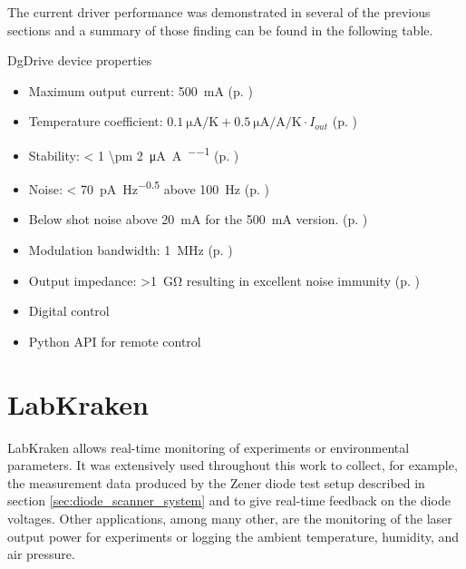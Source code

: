 The current driver performance was demonstrated in several of the previous sections and a summary of those finding can be found in the following table.
\begin{center}
    \begin{deviceProperties}[label={lst:dgDrive_summary}]{DgDrive device properties}
    \begin{itemize}
        \item Maximum output current: \qty{500}{\mA} (p. \pageref{tab:dgDrive_configurations})
        \item Temperature coefficient: $\qty{0.1}{\uA \per \K} + \qty{0.5}{\uA \per \A \per \K} \cdot I_{out}$ (p. \pageref{fig:dgDrive_tempco_50mA})
        \item Stability: \qty{< 1 \pm 2}{\uA \per \A \per \year} (p. \pageref{fig:stability_dgDrive})
        \item Noise: \qty{< 70}{\pA \per \Hz\tothe{0.5}} above \qty{100}{\Hz} (p. \pageref{fig:laser_driver_noise_measurement})
        \item Below shot noise above \qty{20}{\mA} for the \qty{500}{\mA} version. (p. \pageref{fig:laser_driver_noise_hmp4040})
        \item Modulation bandwidth: \qty{1}{\MHz} (p. \pageref{fig:dgDrive_modulation_amplitude})
        \item Output impedance: \qty{>1}{\giga\ohm} resulting in excellent noise immunity (p. \pageref{fig:dgDrive_output_impedance_comparison})
        \item Digital control
        \item Python API for remote control
    \end{itemize}
    \end{deviceProperties}
\end{center}



\clearpage
\section{LabKraken}%
\label{sec:res_labkraken}%
LabKraken allows real-time monitoring of experiments or environmental parameters. It was extensively used throughout this work to collect, for example, the measurement data produced by the Zener diode test setup described in section \ref{sec:diode_scanner_system} and to give real-time feedback on the diode voltages. Other applications, among many other, are the monitoring of the laser output power for experiments or logging the ambient temperature, humidity, and air pressure.

